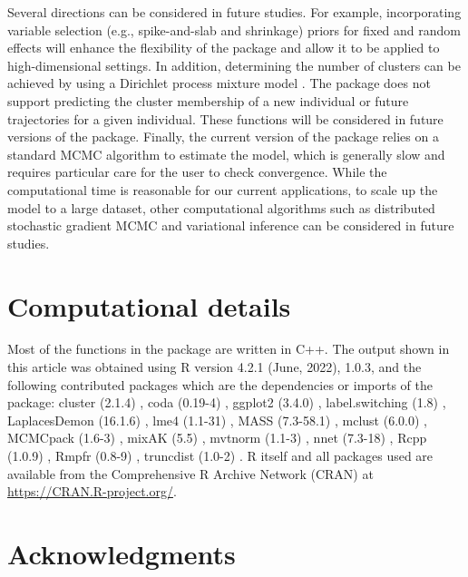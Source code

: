 Several directions can be considered in future studies. For example, incorporating variable selection (e.g., spike-and-slab and shrinkage) priors \citep{Lu2021b, Lu2021} for fixed and random effects will enhance the flexibility of the package and allow it to be applied to high-dimensional settings. In addition, determining the number of clusters can be achieved by using a Dirichlet process mixture model \citep{Escobar1994, Lu2023a, Lu2024}. The package does not support predicting the cluster membership of a new individual or future trajectories for a given individual. These functions will be considered in future versions of the package. Finally, the current version of the  package relies on a standard MCMC algorithm to estimate the model, which is generally slow and requires particular care for the user to check convergence. While the computational time is reasonable for our current applications, to scale up the model to a large dataset, other computational algorithms such as distributed stochastic gradient MCMC \citep{Ahn2014} and variational inference \citep{Blei2017} can be considered in future studies.

\section*{Computational details}

Most of the functions in the  package are written in C++. The output shown in this article was obtained using R version 4.2.1 (June, 2022),  1.0.3, and the following contributed packages which are the dependencies or imports of the  package: cluster (2.1.4) \citep{Maechler2022}, coda (0.19-4) \citep{Martyn2006}, ggplot2 (3.4.0) \citep{Wickham2016}, label.switching (1.8) \citep{Papastamoulis2016}, LaplacesDemon (16.1.6) \citep{Hall2022}, lme4 (1.1-31) \citep{Bates2015}, MASS (7.3-58.1) \citep{Ripley2013}, mclust (6.0.0) \citep{Fraley2006}, MCMCpack (1.6-3) \citep{Martin2011}, mixAK (5.5) \citep{Komarek2014}, mvtnorm (1.1-3) \citep{Genz2021}, nnet (7.3-18) \citep{Ripley2016}, Rcpp (1.0.9) \citep{Eddelbuettel2011}, Rmpfr (0.8-9) \citep{Maechler2022a}, truncdist (1.0-2) \citep{Novomestky2016}. R itself and all packages used are available from the Comprehensive R Archive Network (CRAN) at \url{https://CRAN.R-project.org/}.

\section*{Acknowledgments}

